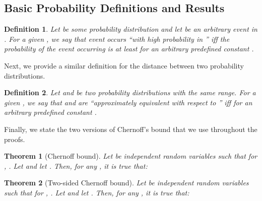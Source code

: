 \documentclass[11pt]{article}
\newtheorem{theorem}{Theorem}[section]
\newtheorem{definition}{Definition}
\begin{document}
\subsection{Basic Probability Definitions and Results}



\begin{definition}
\label{def:whp}
	Let  be some probability distribution and let  be an arbitrary event in . For a given , we say that event  occurs ``with high probability in '' iff the probability of the event  occurring is at least  for an arbitrary predefined constant .
\end{definition}


Next, we provide a similar definition for the distance between two probability distributions.

\begin{definition}
	Let  and  be two probability distributions with the same range. For a given , we say that  and  are ``approximately equivalent with respect to '' iff  for an arbitrary predefined constant .
\end{definition}	
	Finally, we state the two versions of Chernoff's bound that we use throughout the proofs.
	
\begin{theorem}[Chernoff bound] Let  be independent random variables such that for , . Let  and let . Then, for any , it is true that:

	
	
	
\end{theorem}


\begin{theorem}[Two-sided Chernoff bound] Let  be independent random variables such that for , . Let  and let . Then, for any , it is true that:

	
	
\end{theorem}
\end{document}
